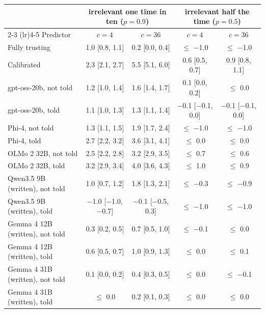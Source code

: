 \begin{tabular}{lcccc}
\toprule
& \multicolumn{2}{c}{irrelevant one time in ten ($p = 0.9$)} & \multicolumn{2}{c}{irrelevant half the time ($p = 0.5$)} \\
\cmidrule(lr){2-3} \cmidrule(lr){4-5}
Predictor & $c = 4$ & $c = 36$ & $c = 4$ & $c = 36$ \\
\midrule
Fully trusting & 1.0 [0.8, 1.1] & 0.2 [0.0, 0.4] & $\leq$ $-$1.0 & $\leq$ $-$1.0 \\
Calibrated & 2.3 [2.1, 2.7] & 5.5 [5.1, 6.0] & 0.6 [0.5, 0.7] & 0.9 [0.8, 1.1] \\
\midrule
gpt-oss-20b, not told & 1.2 [1.0, 1.4] & 1.6 [1.4, 1.7] & 0.1 [0.0, 0.2] & $\leq$ 0.0 \\
gpt-oss-20b, told & 1.1 [1.0, 1.3] & 1.3 [1.1, 1.4] & $-$0.1 [$-$0.1, 0.0] & $-$0.1 [$-$0.1, 0.0] \\
Phi-4, not told & 1.3 [1.1, 1.5] & 1.9 [1.7, 2.4] & $\leq$ $-$1.0 & $\leq$ $-$1.0 \\
Phi-4, told & 2.7 [2.2, 3.2] & 3.6 [3.1, 4.1] & $\leq$ 0.0 & $\leq$ 0.0 \\
OLMo 2 32B, not told & 2.5 [2.2, 2.8] & 3.2 [2.9, 3.5] & $\leq$ 0.7 & $\leq$ 0.6 \\
OLMo 2 32B, told & 3.2 [2.9, 3.4] & 4.0 [3.6, 4.3] & $\leq$ 1.0 & $\leq$ 0.9 \\
Qwen3.5 9B (written), not told & 1.0 [0.7, 1.2] & 1.8 [1.3, 2.1] & $\leq$ $-$0.3 & $\leq$ $-$0.9 \\
Qwen3.5 9B (written), told & $-$1.0 [$-$1.0, $-$0.7] & $-$0.1 [$-$0.5, 0.3] & $\leq$ $-$1.0 & $\leq$ $-$1.0 \\
Gemma 4 12B (written), not told & 0.3 [0.2, 0.5] & 0.7 [0.5, 1.0] & $\leq$ $-$0.1 & $\leq$ 0.0 \\
Gemma 4 12B (written), told & 0.6 [0.5, 0.7] & 1.0 [0.9, 1.3] & $\leq$ 0.0 & $\leq$ 0.1 \\
Gemma 4 31B (written), not told & 0.1 [0.0, 0.2] & 0.4 [0.3, 0.5] & $\leq$ 0.0 & $\leq$ $-$0.1 \\
Gemma 4 31B (written), told & $\leq$ 0.0 & 0.2 [0.1, 0.3] & $\leq$ 0.0 & $\leq$ 0.0 \\
\bottomrule
\end{tabular}
